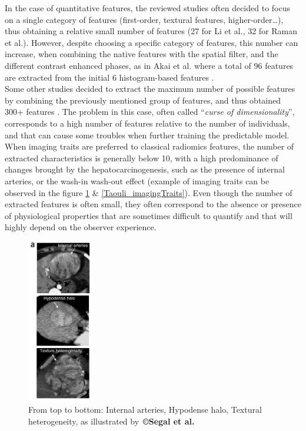 In the case of quantitative features, the reviewed studies often decided
to focus on a single category of features (first-order, textural
features, higher-order\ldots{}), thus obtaining a relative small number
of features (27 for Li et al., 32 for Raman et al.).
However, despite choosing a specific category of features, this number
can increase, when combining the native features with the spatial
filter, and the different contrast enhanced phases, as in Akai
et al. where a total of 96 features are extracted from the initial 6
histogram-based features \cite{Akai2018}.\\
Some other studies decided to extract the maximum number of possible features by
combining the previously mentioned group of features, and thus obtained
300+ features \cite{Zhou2017a,Peng2018,Bakr2017}. The problem in this case, often called ``\emph{curse of
dimensionality}'', corresponds to a high number of features relative to
the number of individuals, and that can cause some troubles when further
training the predictable model. \\
When imaging traits are preferred to classical radiomics features, the
number of extracted characteristics is generally below 10, with a high
predominance of changes brought by the hepatocarcinogenesis, such as the
presence of internal arteries, or the wash-in wash-out effect (example
of imaging traits can be observed in the figure \ref{Segal_imagingTraits} \& \ref{Taouli_imagingTraits}). Even though
the number of extracted features is often small, they often correspond
to the absence or presence of physiological properties that are sometimes
difficult to quantify and that will highly depend on the observer
experience.

\begin{figure}[ht!]
\centering
\includegraphics[width=1.13125in,height=2.82813in]{./images/image3.png}
\caption{From top to bottom: Internal arteries, Hypodense halo, Textural heterogeneity, as illustrated by \textbf{©Segal et al.} \cite{Segal2007}}
\label{Segal_imagingTraits}
\end{figure}

